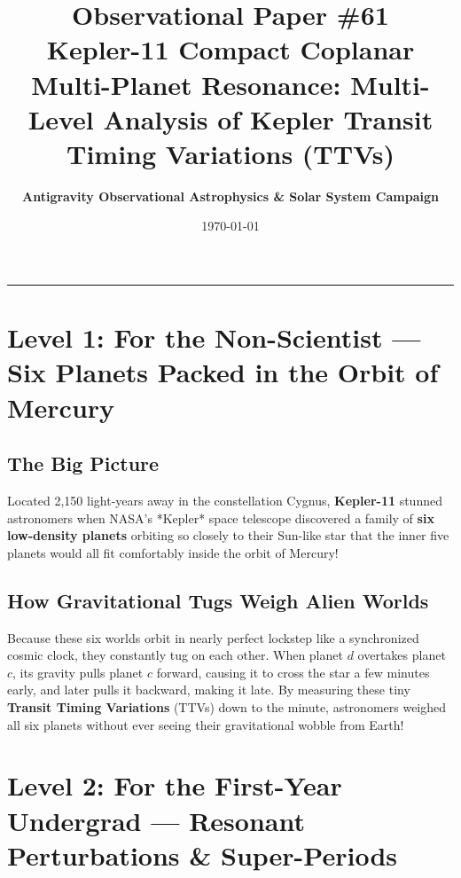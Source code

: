 \documentclass[11pt,a4paper]{article}
\title{\Huge \textbf{Observational Paper \#61}\\ \Large Kepler-11 Compact Coplanar Multi-Planet Resonance: Multi-Level Analysis of Kepler Transit Timing Variations (TTVs)}
\author{\textbf{Antigravity Observational Astrophysics \& Solar System Campaign}}
\date{\today}
\begin{document}
\maketitle

\vspace{-1em}
\begin{center}
\rule{\textwidth}{1.5pt}
\end{center}

\section*{Level 1: For the Non-Scientist — Six Planets Packed in the Orbit of Mercury}

\subsection*{The Big Picture}
Located 2,150 light-years away in the constellation Cygnus, \textbf{Kepler-11} stunned astronomers when NASA's *Kepler* space telescope discovered a family of \textbf{six low-density planets} orbiting so closely to their Sun-like star that the inner five planets would all fit comfortably inside the orbit of Mercury!

\subsection*{How Gravitational Tugs Weigh Alien Worlds}
Because these six worlds orbit in nearly perfect lockstep like a synchronized cosmic clock, they constantly tug on each other. When planet $d$ overtakes planet $c$, its gravity pulls planet $c$ forward, causing it to cross the star a few minutes early, and later pulls it backward, making it late. By measuring these tiny \textbf{Transit Timing Variations} (TTVs) down to the minute, astronomers weighed all six planets without ever seeing their gravitational wobble from Earth!

\newpage

\section*{Level 2: For the First-Year Undergrad — Resonant Perturbations \& Super-Periods}
\end{document}
